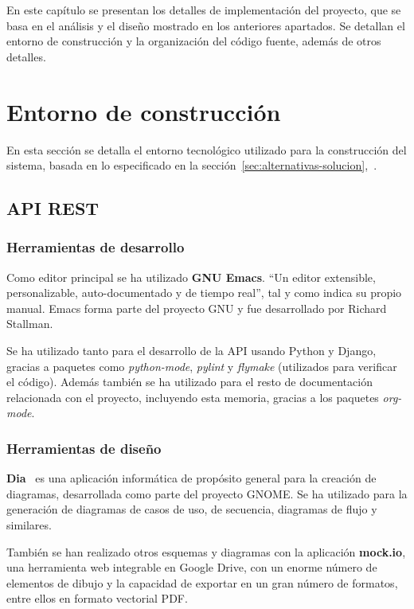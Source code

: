 En este capítulo se presentan los detalles de implementación del proyecto,
que se basa en el análisis y el diseño mostrado en los anteriores apartados. Se
detallan el entorno de construcción y la organización del código fuente, además
de otros detalles.

\section{Entorno de construcción}

En esta sección se detalla el entorno tecnológico utilizado para la construcción
del sistema, basada en lo especificado en la
sección~\ref{sec:alternativas-solucion},\textit{~}.

\subsection{API REST}
\label{subsec:entorno-api}

\subsubsection{Herramientas de desarrollo}

Como editor principal se ha utilizado \textbf{GNU Emacs}. ``Un editor extensible,
personalizable, auto-documentado y de tiempo real'', tal y como indica su propio
manual. Emacs forma parte del proyecto GNU y fue desarrollado por Richard
Stallman.

Se ha utilizado tanto para el desarrollo de la API usando Python y Django,
gracias a paquetes como \textit{python-mode}, \textit{pylint} y \textit{flymake}
(utilizados para verificar el código). Además también se ha utilizado para
el resto de documentación relacionada con el proyecto, incluyendo esta memoria,
gracias a los paquetes \textit{org-mode}.

\subsubsection{Herramientas de diseño}

\textbf{Dia}~\cite{dia} es una aplicación informática de propósito general para
la creación de diagramas, desarrollada como parte del proyecto GNOME. Se ha
utilizado para la generación de diagramas de casos de uso, de secuencia,
diagramas de flujo y similares.

También se han realizado otros esquemas y diagramas con la aplicación
\textbf{mock.io}, una herramienta web integrable en Google Drive, con un enorme
número de elementos de dibujo y la capacidad de exportar en un gran número de
formatos, entre ellos en formato vectorial PDF.

